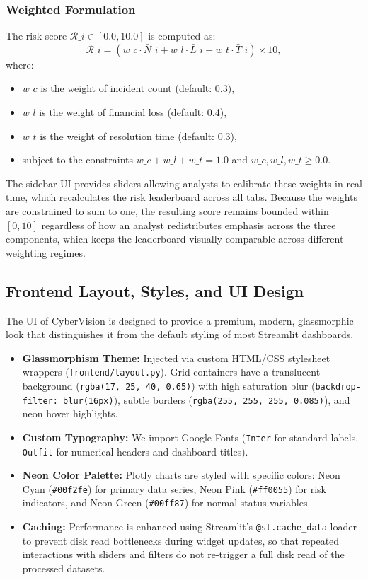 \documentclass[a4paper, 12pt]{report}
\begin{document}
\subsubsection{Weighted Formulation}
The risk score $\mathcal{R}\_i \in [0.0, 10.0]$ is computed as:
\begin{equation}
\mathcal{R}\_i = \left( w\_c \cdot \bar{N}\_i + w\_l \cdot \bar{L}\_i + w\_t \cdot \bar{T}\_i \right) \times 10,
\end{equation}
where:
\begin{itemize}
    \item $w\_c$ is the weight of incident count (default: 0.3),
    \item $w\_l$ is the weight of financial loss (default: 0.4),
    \item $w\_t$ is the weight of resolution time (default: 0.3),
    \item subject to the constraints $w\_c + w\_l + w\_t = 1.0$ and $w\_c, w\_l, w\_t \geq 0.0$.
\end{itemize}
The sidebar UI provides sliders allowing analysts to calibrate these weights in real time, which recalculates the risk leaderboard across all tabs. Because the weights are constrained to sum to one, the resulting score remains bounded within $[0, 10]$ regardless of how an analyst redistributes emphasis across the three components, which keeps the leaderboard visually comparable across different weighting regimes.

\subsection{Frontend Layout, Styles, and UI Design}
The UI of CyberVision is designed to provide a premium, modern, glassmorphic look that distinguishes it from the default styling of most Streamlit dashboards.
\begin{itemize}
    \item \textbf{Glassmorphism Theme:} Injected via custom HTML/CSS stylesheet wrappers (\texttt{frontend/layout.py}). Grid containers have a translucent background (\texttt{rgba(17, 25, 40, 0.65)}) with high saturation blur (\texttt{backdrop-filter: blur(16px)}), subtle borders (\texttt{rgba(255, 255, 255, 0.085)}), and neon hover highlights.
    \item \textbf{Custom Typography:} We import Google Fonts (\texttt{Inter} for standard labels, \texttt{Outfit} for numerical headers and dashboard titles).
    \item \textbf{Neon Color Palette:} Plotly charts are styled with specific colors: Neon Cyan (\texttt{\#00f2fe}) for primary data series, Neon Pink (\texttt{\#ff0055}) for risk indicators, and Neon Green (\texttt{\#00ff87}) for normal status variables.
    \item \textbf{Caching:} Performance is enhanced using Streamlit's \texttt{@st.cache\_data} loader to prevent disk read bottlenecks during widget updates, so that repeated interactions with sliders and filters do not re-trigger a full disk read of the processed datasets.
\end{itemize}
\end{document}
